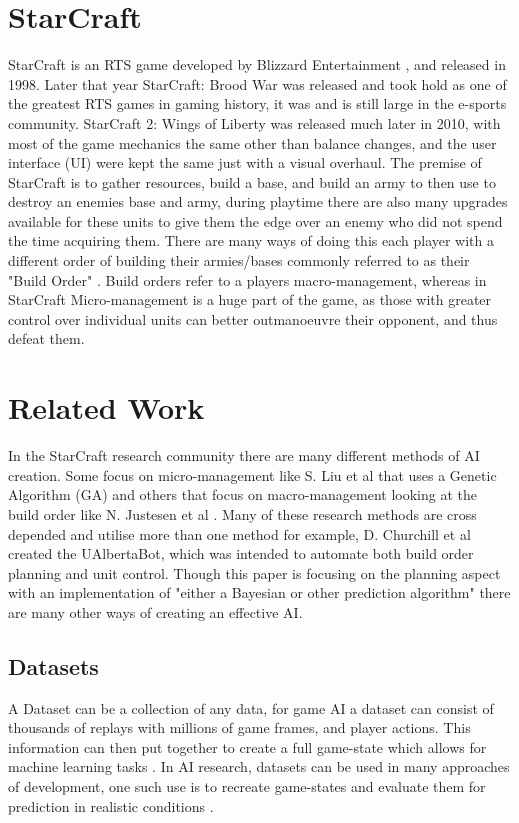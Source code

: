 \documentclass[journal]{IEEEtran}
\begin{document}
\section{StarCraft}
StarCraft is an RTS game developed by Blizzard Entertainment \cite{Blizzard}, and released in 1998. Later that year StarCraft: Brood War was released and took hold as one of the greatest RTS games in gaming history, it was and is still large in the e-sports community. StarCraft 2: Wings of Liberty was released much later in 2010, with most of the game mechanics the same other than balance changes, and the user interface (UI) were kept the same just with a visual overhaul. The premise of StarCraft is to gather resources, build a base, and build an army to then use to destroy an enemies base and army, during playtime there are also many upgrades available for these units to give them the edge over an enemy who did not spend the time acquiring them. There are many ways of doing this each player with a different order of building their armies/bases commonly referred to as their "Build Order" \cite{BuildOrder}. Build orders refer to a players macro-management, whereas in StarCraft Micro-management is a huge part of the game, as those with greater control over individual units can better outmanoeuvre their opponent, and thus defeat them. 

\section{Related Work}
In the StarCraft research community there are many different methods of AI creation. Some focus on micro-management like S. Liu et al \cite{EffectiveMicro} that uses a Genetic Algorithm (GA) and others that focus on macro-management looking at the build order like N. Justesen et al \cite{OnlineEvo}. Many of these research methods are cross depended and utilise more than one method for example, D. Churchill et al \cite{Agents} created the UAlbertaBot, which was intended to automate both build order planning and unit control. Though this paper is focusing on the planning aspect with an implementation of "either a Bayesian or other prediction algorithm" there are many other ways of creating an effective AI.

\subsection{Datasets}
A Dataset can be a collection of any data, for game AI a dataset can consist of thousands of replays with millions of game frames, and player actions\cite{Dataset}. This information can then put together to create a full game-state which allows for machine learning tasks \cite{Dataset17}. In AI research, datasets can be used in many approaches of development, one such use is to recreate game-states and evaluate them for prediction in realistic conditions \cite{SpecialTactics}.
\end{document}
